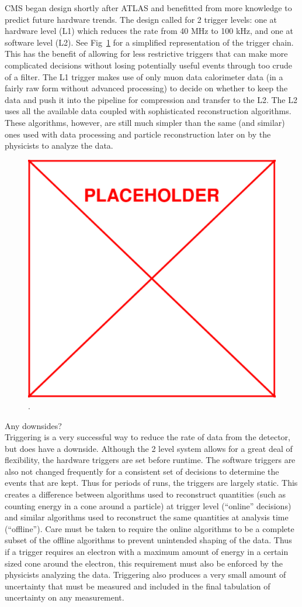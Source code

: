 	CMS began design shortly after ATLAS and benefitted from more knowledge to predict future hardware trends. The design called for 2 trigger levels: one at hardware level (L1) which reduces the rate from 40 MHz to 100 kHz, and one at software level (L2). See Fig~\ref{fig:trigger_chain} for a simplified representation of the trigger chain. This has the benefit of allowing for less restrictive triggers that can make more complicated decisions without losing potentially useful events through too crude of a filter. The L1 trigger makes use of only muon data calorimeter data (in a fairly raw form without advanced processing) to decide on whether to keep the data and push it into the pipeline for compression and transfer to the L2. The L2 uses all the available data coupled with sophisticated reconstruction algorithms. These algorithms, however, are still much simpler than the same (and similar) ones used with data processing and particle reconstruction later on by the physicists to analyze the data.\\
	\begin{figure}[h]
\begin{center}
\includegraphics[width=0.48\linewidth]{Figs/placeholder.pdf}
\caption{\label{fig:trigger_chain}
.
}
\end{center}
\end{figure}

	Any downsides?\\
	
	Triggering is a very successful way to reduce the rate of data from the detector, but does have a downside. Although the 2 level system allows for a great deal of flexibility, the hardware triggers are set before runtime. The software triggers are also not changed frequently for a consistent set of decisions to determine the events that are kept. Thus for periods of runs, the triggers are largely static. This creates a difference between algorithms used to reconstruct quantities (such as counting energy in a cone around a particle) at trigger level (``online'' decisions) and similar algorithms used to reconstruct the same quantities at analysis time (``offline''). Care must be taken to require the online algorithms to be a complete subset of the offline algorithms to prevent unintended shaping of the data. Thus if a trigger requires an electron with a maximum amount of energy in a certain sized cone around the electron, this requirement must also be enforced by the physicists analyzing the data. Triggering also produces a very small amount of uncertainty that must be measured and included in the final tabulation of uncertainty on any measurement.\\
	